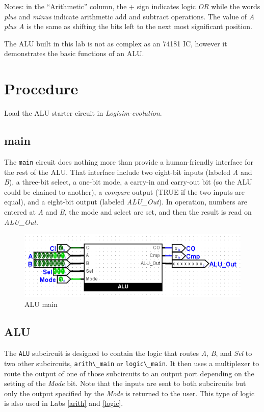 Notes: in the ``Arithmetic'' column, the + sign indicates logic \textit{OR} while the words \textit{plus} and \textit{minus} indicate arithmetic add and subtract operations. The value of \textit{A plus A} is the same as shifting the bits left to the next most significant position.

The \ac{ALU} built in this lab is not as complex as an 74181 \ac{IC}, however it demonstrates the basic functions of an \ac{ALU}.

\section{Procedure}

Load the \ac{ALU} starter circuit in \textit{Logisim-evolution}. 

\subsection{main}

The \lstinline[columns=fixed]|main| circuit does nothing more than provide a human-friendly interface for the rest of the \ac{ALU}. That interface include two eight-bit inputs (labeled \textit{A} and \textit{B}), a three-bit select, a one-bit mode, a carry-in and carry-out bit (so the \ac{ALU} could be chained to another), a \textit{compare} output (TRUE if the two inputs are equal), and a eight-bit output (labeled \textit{ALU\_Out}). In operation, numbers are entered at \textit{A} and \textit{B}, the mode and select are set, and then the result is read on \textit{ALU\_Out}.

\begin{figure}[H]
	\centering
	\includegraphics[width=\maxwidth{.95\linewidth}]{gfx/alu-01}
	\caption{ALU main}
	\label{fig:alu-01}
\end{figure}

\subsection{ALU}

The \lstinline[columns=fixed]|ALU| subcircuit is designed to contain the logic that routes \textit{A}, \textit{B}, and \textit{Sel} to two other subcircuits, \lstinline[columns=fixed]|arith\_main| or \lstinline[columns=fixed]|logic\_main|. It then uses a multiplexer to route the output of one of those subcircuits to an output port depending on the setting of the \textit{Mode} bit. Note that the inputs are sent to both subcircuits but only the output specified by the \textit{Mode} is returned to the user. This type of logic is also used in Labs \ref{arith} and \ref{logic}.

